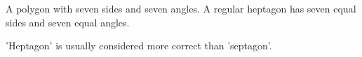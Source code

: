 A polygon with seven sides and seven angles. A regular heptagon 
has seven equal sides and seven equal angles.
\par
'Heptagon' is usually considered more correct than 'septagon'.
